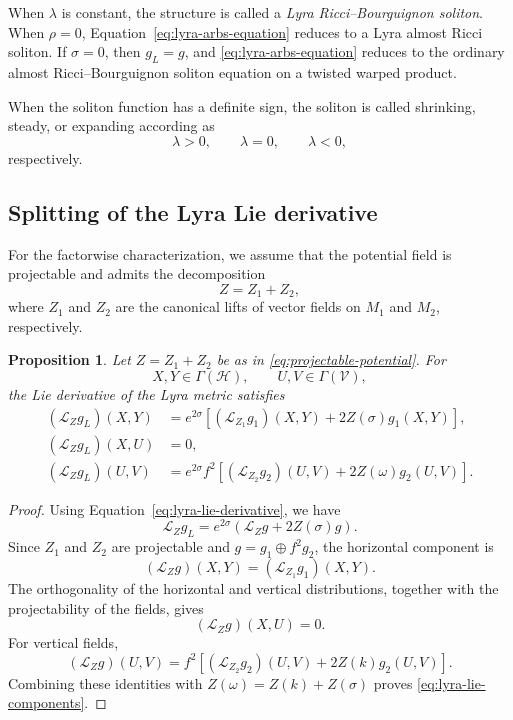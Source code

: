 \documentclass[a4paper,11pt]{article}
\theoremstyle{plain}
\newtheorem{proposition}{Proposition}[section]
\numberwithin{equation}{section}
\begin{document}
When \(\lambda\) is constant, the structure is called a
\emph{Lyra Ricci--Bourguignon soliton}. When \(\rho=0\),
Equation~\eqref{eq:lyra-arbs-equation} reduces to a Lyra almost
Ricci soliton. If \(\sigma=0\), then \(g_{L}=g\), and
\eqref{eq:lyra-arbs-equation} reduces to the ordinary almost
Ricci--Bourguignon soliton equation on a twisted warped product.

When the soliton function has a definite sign, the soliton is
called shrinking, steady, or expanding according as
\[
\lambda>0,
\qquad
\lambda=0,
\qquad
\lambda<0,
\]
respectively.

\subsection{Splitting of the Lyra Lie derivative}
\label{subsec:lyra-lie-splitting}

For the factorwise characterization, we assume that the potential
field is projectable and admits the decomposition
\begin{equation}
	Z
	=
	Z_{1}+Z_{2},
	\label{eq:projectable-potential}
\end{equation}
where \(Z_{1}\) and \(Z_{2}\) are the canonical lifts of vector
fields on \(M_{1}\) and \(M_{2}\), respectively.

\begin{proposition}
	\label{prop:lyra-lie-splitting}
	Let \(Z=Z_{1}+Z_{2}\) be as in
	\eqref{eq:projectable-potential}. For
	\[
	X,Y\in\Gamma(\mathcal H),
	\qquad
	U,V\in\Gamma(\mathcal V),
	\]
	the Lie derivative of the Lyra metric satisfies
	\begin{subequations}
		\label{eq:lyra-lie-components}
		\begin{align}
			(\mathcal L_{Z}g_{L})(X,Y)
			&=
			e^{2\sigma}
			\left[
			(\mathcal L_{Z_{1}}g_{1})(X,Y)
			+
			2Z(\sigma)g_{1}(X,Y)
			\right],
			\label{eq:lyra-lie-horizontal}
			\\
			(\mathcal L_{Z}g_{L})(X,U)
			&=
			0,
			\label{eq:lyra-lie-mixed}
			\\
			(\mathcal L_{Z}g_{L})(U,V)
			&=
			e^{2\sigma}f^{2}
			\left[
			(\mathcal L_{Z_{2}}g_{2})(U,V)
			+
			2Z(\omega)g_{2}(U,V)
			\right].
			\label{eq:lyra-lie-vertical}
		\end{align}
	\end{subequations}
\end{proposition}

\begin{proof}
	Using Equation~\eqref{eq:lyra-lie-derivative}, we have
	\[
	\mathcal L_{Z}g_{L}
	=
	e^{2\sigma}
	\left(
	\mathcal L_{Z}g
	+
	2Z(\sigma)g
	\right).
	\]
	Since \(Z_{1}\) and \(Z_{2}\) are projectable and
	\(g=g_{1}\oplus f^{2}g_{2}\), the horizontal component is
	\[
	(\mathcal L_{Z}g)(X,Y)
	=
	(\mathcal L_{Z_{1}}g_{1})(X,Y).
	\]
	The orthogonality of the horizontal and vertical distributions,
	together with the projectability of the fields, gives
	\[
	(\mathcal L_{Z}g)(X,U)=0.
	\]
	For vertical fields,
	\[
	(\mathcal L_{Z}g)(U,V)
	=
	f^{2}
	\left[
	(\mathcal L_{Z_{2}}g_{2})(U,V)
	+
	2Z(k)g_{2}(U,V)
	\right].
	\]
	Combining these identities with
	\(Z(\omega)=Z(k)+Z(\sigma)\) proves
	\eqref{eq:lyra-lie-components}.
\end{proof}
\end{document}
